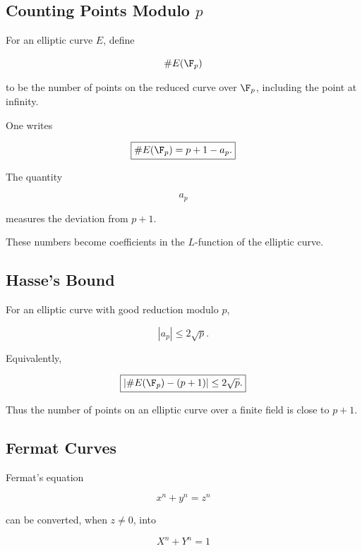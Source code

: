\subsection{Counting Points Modulo \(p\)}
\label{subsec:counting-points-mod-p}

For an elliptic curve \(E\), define

\[ \#E(\F_p) \]

to be the number of points on the reduced curve over \(\F_p\), including the
point at infinity.

One writes

\[ \boxed{\#E(\F_p)=p+1-a_p.} \]

The quantity

\[ a_p \]

measures the deviation from \(p+1\).

These numbers become coefficients in the \(L\)-function of the elliptic
curve.

\subsection{Hasse's Bound}
\label{subsec:hasse-bound-elliptic}

\begin{theorem}[Hasse]
For an elliptic curve with good reduction modulo \(p\),

\[ \boxed{|a_p|\leq2\sqrt p.} \]
\end{theorem}

Equivalently,

\[ \boxed{|\#E(\F_p)-(p+1)|\leq2\sqrt p.} \]

Thus the number of points on an elliptic curve over a finite field is close
to \(p+1\).

\subsection{Fermat Curves}
\label{subsec:fermat-curves}

Fermat's equation

\[ x^n+y^n=z^n \]

can be converted, when \(z\neq0\), into

\[ X^n+Y^n=1 \]

